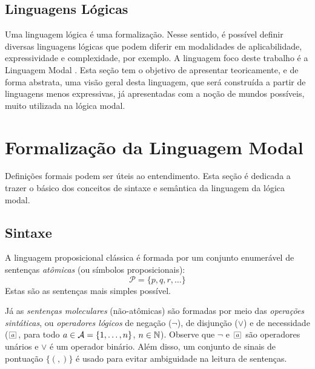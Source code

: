 \subsection{Linguagens Lógicas}
\label{sec:linguagens}
Uma linguagem lógica é uma formalização.  Nesse sentido, é possível definir
diversas linguagens lógicas que podem diferir em modalidades de aplicabilidade,
expressividade e complexidade, por exemplo. A linguagem foco deste trabalho é a
Linguagem Modal . Esta seção tem o objetivo de apresentar
teoricamente, e de forma abstrata, uma visão geral desta linguagem, que será
construída a partir de linguagens menos expressivas, já apresentadas com a noção
de mundos possíveis, muito utilizada na lógica modal.






\section{Formalização da Linguagem Modal }
Definições formais podem ser úteis ao entendimento.
Esta seção é dedicada a trazer o básico dos conceitos de sintaxe e semântica da linguagem da
lógica modal. 

\subsection{Sintaxe}
\label{sec:sintaxe}

A linguagem proposicional clássica é formada por um conjunto enumerável de sentenças
\textit{at\^omicas} (ou símbolos proposicionais): 
\begin{equation}
\label{simb_prop}
    \mathcal{P} = \{p, q, r, \ldots\}
\end{equation}
Estas são as sentenças mais simples possível.

Já as \textit{sentenças moleculares} (não-at\^omicas) são formadas por meio das
\textit{operações sintáticas}, ou \textit{operadores lógicos} de negação
($\neg$), de disjunção ($\vee$)  e de necessidade ($\nec{\agent}$, para todo
$a \in {\cal{A}} = \{1,\ldots, n\}$, $n \in \mbox{$\mathbb N$}$). Observe que $\neg$ e
$\nec{\agent}$ são operadores unários e $\vee$ é um operador binário. Além
disso, um conjunto de sinais de pontuação $\{(,)\}$ é usado para
evitar ambiguidade na leitura de sentenças.


